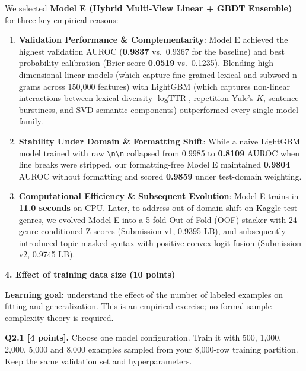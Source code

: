 \documentclass[11pt,letterpaper]{article}
\begin{document}
We selected \textbf{Model E (Hybrid Multi-View Linear + GBDT Ensemble)} for three key empirical reasons:
\begin{enumerate}[leftmargin=*,itemsep=1pt,topsep=2pt]
    \item \textbf{Validation Performance \& Complementarity}: Model E achieved the highest validation AUROC (\textbf{0.9837} vs.\ 0.9367 for the baseline) and best probability calibration (Brier score \textbf{0.0519} vs.\ 0.1235). Blending high-dimensional linear models (which capture fine-grained lexical and subword n-grams across 150,000 features) with LightGBM (which captures non-linear interactions between lexical diversity $\log\text{TTR}$, repetition Yule's $K$, sentence burstiness, and SVD semantic components) outperformed every single model family.
    \item \textbf{Stability Under Domain \& Formatting Shift}: While a naive LightGBM model trained with raw \texttt{\textbackslash n\textbackslash n} collapsed from 0.9985 to \textbf{0.8109} AUROC when line breaks were stripped, our formatting-free Model E maintained \textbf{0.9804} AUROC without formatting and scored \textbf{0.9859} under test-domain weighting.
    \item \textbf{Computational Efficiency \& Subsequent Evolution}: Model E trains in \textbf{11.0 seconds} on CPU. Later, to address out-of-domain shift on Kaggle test genres, we evolved Model E into a 5-fold Out-of-Fold (OOF) stacker with 24 genre-conditioned Z-scores (Submission v1, 0.9395 LB), and subsequently introduced topic-masked syntax with positive convex logit fusion (Submission v2, 0.9745 LB).
\end{enumerate}

\newpage

{\large\textbf{4. Effect of training data size (10 points)}}
\vspace{2pt}

\textbf{Learning goal:} understand the effect of the number of labeled examples on fitting and generalization. This is an empirical exercise; no formal sample-complexity theory is required.

\vspace{3pt}
\textbf{Q2.1 [4 points].} Choose one model configuration. Train it with 500, 1,000, 2,000, 5,000 and 8,000 examples sampled from your 8,000-row training partition. Keep the same validation set and hyperparameters.
\end{document}
